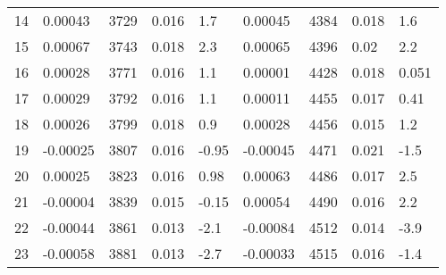\begin{tabular}{llrlllrll}
14   &              0.00043 &  3729 &  0.016 &    1.7 &              0.00045 &  4384 &  0.018 &    1.6 \\
15   &              0.00067 &  3743 &  0.018 &    2.3 &              0.00065 &  4396 &   0.02 &    2.2 \\
16   &              0.00028 &  3771 &  0.016 &    1.1 &              0.00001 &  4428 &  0.018 &  0.051 \\
17   &              0.00029 &  3792 &  0.016 &    1.1 &              0.00011 &  4455 &  0.017 &   0.41 \\
18   &              0.00026 &  3799 &  0.018 &    0.9 &              0.00028 &  4456 &  0.015 &    1.2 \\
19   &             -0.00025 &  3807 &  0.016 &  -0.95 &             -0.00045 &  4471 &  0.021 &   -1.5 \\
20   &              0.00025 &  3823 &  0.016 &   0.98 &              0.00063 &  4486 &  0.017 &    2.5 \\
21   &             -0.00004 &  3839 &  0.015 &  -0.15 &              0.00054 &  4490 &  0.016 &    2.2 \\
22   &             -0.00044 &  3861 &  0.013 &   -2.1 &             -0.00084 &  4512 &  0.014 &   -3.9 \\
23   &             -0.00058 &  3881 &  0.013 &   -2.7 &             -0.00033 &  4515 &  0.016 &   -1.4 \\
\bottomrule
\end{tabular}

